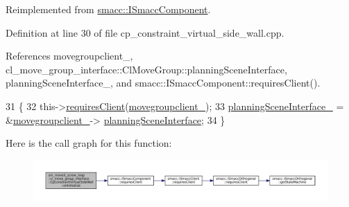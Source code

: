 Reimplemented from \hyperlink{classsmacc_1_1ISmaccComponent_ae6f71d008db12553912e9436184b9e65}{smacc\+::\+I\+Smacc\+Component}.



Definition at line 30 of file cp\+\_\+constraint\+\_\+virtual\+\_\+side\+\_\+wall.\+cpp.



References movegroupclient\+\_\+, cl\+\_\+move\+\_\+group\+\_\+interface\+::\+Cl\+Move\+Group\+::planning\+Scene\+Interface, planning\+Scene\+Interface\+\_\+, and smacc\+::\+I\+Smacc\+Component\+::requires\+Client().


\begin{DoxyCode}
31         \{
32             this->\hyperlink{classsmacc_1_1ISmaccComponent_a36c085d906fbae0fcaee817aaeafebf4}{requiresClient}(\hyperlink{classsm__moveit__screw__loop_1_1cl__move__group__interface_1_1CpConstraintVirtualSideWall_a1de1c90ad714b588914a7c6543c6c788}{movegroupclient\_});
33             \hyperlink{classsm__moveit__screw__loop_1_1cl__move__group__interface_1_1CpConstraintVirtualSideWall_a457d54c11f9b78f4b411f52964c46151}{planningSceneInterface\_} = &\hyperlink{classsm__moveit__screw__loop_1_1cl__move__group__interface_1_1CpConstraintVirtualSideWall_a1de1c90ad714b588914a7c6543c6c788}{movegroupclient\_}->
      \hyperlink{classcl__move__group__interface_1_1ClMoveGroup_a11bfab580f36e2ad32c9b37d6f58f44c}{planningSceneInterface};
34         \}
\end{DoxyCode}
Here is the call graph for this function\+:
\nopagebreak
\begin{figure}[H]
\begin{center}
\leavevmode
\includegraphics[width=350pt]{classsm__moveit__screw__loop_1_1cl__move__group__interface_1_1CpConstraintVirtualSideWall_a34f0babfdf0304d34cd42e77800f1df0_cgraph}
\end{center}
\end{figure}
\mbox{\label{classsm__moveit__screw__loop_1_1cl__move__group__interface_1_1CpConstraintVirtualSideWall_a4582ad379597080236133d0f354f694e}} 
